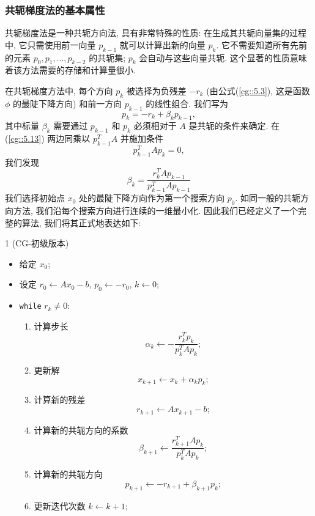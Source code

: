 \documentclass[a4paper]{ctexart}
\newcommand{\hl}[1]
{\noindent {\bf {#1}}}
\begin{document}
{\subsubsection*{共轭梯度法的基本属性}

共轭梯度法是一种共轭方向法, 具有非常特殊的性质: 在生成其共轭向量集的过程中, 
它只需使用前一向量 $p_{k - 1}$ 就可以计算出新的向量 $p_k$. 
它不需要知道所有先前的元素 $p_0, p_1,..., p_{k-2}$ 的共轭集; 
$p_k$ 会自动与这些向量共轭. 这个显著的性质意味着该方法需要的存储和计算量很小.

在共轭梯度方法中, 每个方向 $p_k$ 被选择为负残差 $-r_k$
(由公式(\ref{cg::5.3}), 这是函数 $\phi$ 的最陡下降方向) 
和前一方向 $p_{k - 1}$ 的线性组合. 我们写为
\begin{equation}
p_k = -r_k + \beta_k p_{k-1}, \label{cg::5.13}
\end{equation}
其中标量 $\beta_k$ 需要通过 $p_{k-1}$ 和 $p_k$ 必须相对于 
$A$ 是共轭的条件来确定. 在 (\ref{cg::5.13}) 两边同乘以 
$p_{k-1}^T A$ 并施加条件 
$$
p_{k-1}^T Ap_k = 0,
$$
我们发现
\begin{equation}  
\beta_k = \frac{r_k^T Ap_{k-1}}{p_{k-1}^T Ap_{k-1}}
\label{cg::14F}
\end{equation}
我们选择初始点 $x_0$ 处的最陡下降方向作为第一个搜索方向 $p_0$. 
如同一般的共轭方向方法, 我们沿每个搜索方向进行连续的一维最小化. 
因此我们已经定义了一个完整的算法, 我们将其正式地表达如下:

\hl{算法} 1 (CG-初级版本)

\begin{itemize}
  \item 给定 $x_0$;
  \item 设定 $r_0 \leftarrow Ax_0 - b$, 
  $p_0 \leftarrow -r_0$, $k \leftarrow 0$;
  \item \verb|while| $r_k \neq 0$:
  \begin{enumerate}
  \item 计算步长 
  $$
  \alpha_k \leftarrow - \frac{r_k^T p_k}{p_k^T A p_k};
  $$
  \item 更新解
  $$ 
  x_{k + 1} \leftarrow x_k + \alpha_k p_k; 
  $$
  \item 计算新的残差
  $$
  r_{k + 1} \leftarrow A x_{k + 1} - b;
  $$
  \item 计算新的共轭方向的系数
  $$
  \beta_{k + 1} \leftarrow \frac{r_{k + 1}^T A p_k}{p_k^T A p_k};
  $$
  \item 计算新的共轭方向
  $$
  p_{k+1} \leftarrow -r_{k + 1} + \beta_{k + 1} p_k;
  $$
  \item 更新迭代次数 $k \leftarrow k + 1$;
  \end{enumerate}
\end{itemize}

}
\end{document}
